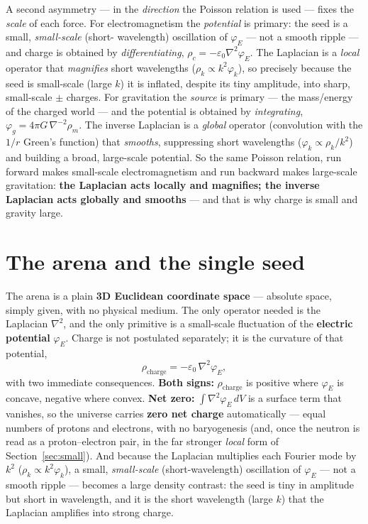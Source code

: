 \documentclass[11pt]{article}
\newcommand{\grad}{\nabla}
\begin{document}
A second asymmetry --- in the \emph{direction} the Poisson relation is used --- fixes the \emph{scale} of each
force. For electromagnetism the \emph{potential} is primary: the seed is a small, \emph{small-scale} (short-
wavelength) oscillation of $\varphi_E$ --- not a smooth ripple --- and charge is obtained by \emph{differentiating},
$\rho_c=-\varepsilon_0\grad^2\varphi_E$. The Laplacian is a \emph{local} operator that \emph{magnifies} short
wavelengths ($\rho_k\propto k^2\varphi_k$), so precisely because the seed is small-scale (large $k$) it is inflated,
despite its tiny amplitude, into sharp, small-scale $\pm$ charges. For gravitation the \emph{source} is primary --- the mass/energy of
the charged world --- and the potential is obtained by \emph{integrating}, $\varphi_g=4\pi G\,\grad^{-2}\rho_m$.
The inverse Laplacian is a \emph{global} operator (convolution with the $1/r$ Green's function) that \emph{smooths},
suppressing short wavelengths ($\varphi_k\propto\rho_k/k^2$) and building a broad, large-scale potential. So the
same Poisson relation, run forward makes small-scale electromagnetism and run backward makes large-scale
gravitation: \textbf{the Laplacian acts locally and magnifies; the inverse Laplacian acts globally and smooths} ---
and that is why charge is small and gravity large.

\section{The arena and the single seed}\label{sec:seed}
The arena is a plain \textbf{3D Euclidean coordinate space} --- absolute space, simply given, with no physical
medium. The only operator needed is the Laplacian $\grad^2$, and the
only primitive is a small-scale fluctuation of the \textbf{electric potential} $\varphi_E$. Charge is not
postulated separately; it is the curvature of that potential,
\begin{equation}
\rho_{\text{charge}} = -\varepsilon_0\,\grad^2\varphi_E ,
\end{equation}
with two immediate consequences. \textbf{Both signs:} $\rho_{\text{charge}}$ is positive where $\varphi_E$ is
concave, negative where convex. \textbf{Net zero:} $\int\grad^2\varphi_E\,dV$ is a surface term that vanishes, so
the universe carries \textbf{zero net charge} automatically --- equal numbers of protons and electrons, with no
baryogenesis (and, once the neutron is read as a proton--electron pair, in the far stronger \emph{local} form of
Section~\ref{sec:small}). And because the Laplacian multiplies each Fourier mode by $k^2$ ($\rho_k\propto k^2\varphi_k$), a
small, \emph{small-scale} (short-wavelength) oscillation of $\varphi_E$ --- not a smooth ripple --- becomes a large
density contrast: the seed is tiny in amplitude but short in wavelength, and it is the short wavelength (large $k$)
that the Laplacian amplifies into strong charge.
\end{document}
